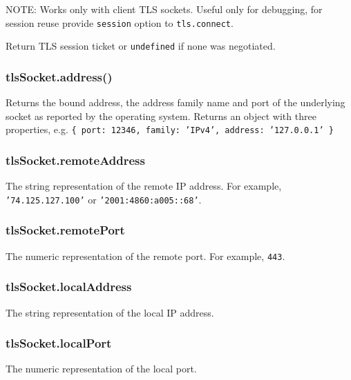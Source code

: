 NOTE: Works only with client TLS sockets. Useful only for debugging, for
session reuse provide \texttt{session} option to \texttt{tls.connect}.

Return TLS session ticket or \texttt{undefined} if none was negotiated.

\subsubsection{tlsSocket.address()}\label{tlssocket.address}

Returns the bound address, the address family name and port of the
underlying socket as reported by the operating system. Returns an object
with three properties, e.g.
\texttt{\{ port: 12346, family: 'IPv4', address: '127.0.0.1' \}}

\subsubsection{tlsSocket.remoteAddress}\label{tlssocket.remoteaddress}

The string representation of the remote IP address. For example,
\texttt{'74.125.127.100'} or \texttt{'2001:4860:a005::68'}.

\subsubsection{tlsSocket.remotePort}\label{tlssocket.remoteport}

The numeric representation of the remote port. For example,
\texttt{443}.

\subsubsection{tlsSocket.localAddress}\label{tlssocket.localaddress}

The string representation of the local IP address.

\subsubsection{tlsSocket.localPort}\label{tlssocket.localport}

The numeric representation of the local port.
